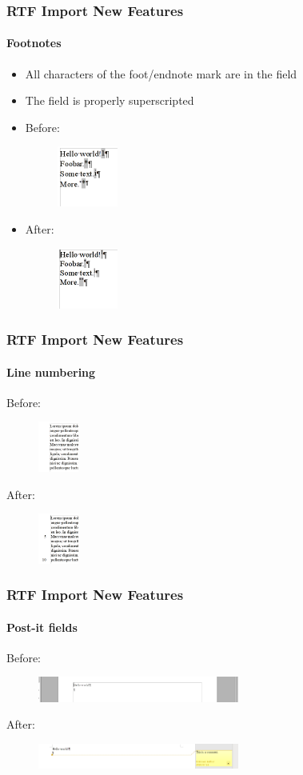 \documentclass{beamer}
\begin{document}
\begin{frame}
\frametitle{RTF Import New Features}
\framesubtitle{Footnotes}
\begin{itemize}
\item All characters of the foot/endnote mark are in the field
\item The field is properly superscripted
\item Before:
\begin{figure}[H]
\includegraphics[width=75px,keepaspectratio]{pic/footnote-old.png}
\end{figure}
\item After:
\begin{figure}[H]
\includegraphics[width=75px,keepaspectratio]{pic/footnote-new.png}
\end{figure}
\end{itemize}
\end{frame}

\begin{frame}
\frametitle{RTF Import New Features}
\framesubtitle{Line numbering}
Before:
\begin{figure}[H]
\includegraphics[width=50px,keepaspectratio]{pic/linenumbering-old.png}
\end{figure}
After:
\begin{figure}[H]
\includegraphics[width=50px,keepaspectratio]{pic/linenumbering-new.png}
\end{figure}
\end{frame}

\begin{frame}
\frametitle{RTF Import New Features}
\framesubtitle{Post-it fields}
Before:
\begin{figure}[H]
\includegraphics[width=250px,keepaspectratio]{pic/postit-old.png}
\end{figure}
After:
\begin{figure}[H]
\includegraphics[width=250px,keepaspectratio]{pic/postit-new.png}
\end{figure}
\end{frame}
\end{document}
